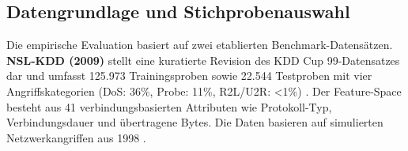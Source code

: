 \documentclass[11pt,a4paper]{article}
\begin{document}
    \subsection{Datengrundlage und Stichprobenauswahl}

    Die empirische Evaluation basiert auf zwei etablierten Benchmark-Datensätzen. \textbf{NSL-KDD (2009)} stellt eine kuratierte Revision des KDD Cup 99-Datensatzes dar und umfasst 125.973 Trainingsproben sowie 22.544 Testproben mit vier Angriffskategorien (DoS: 36\%, Probe: 11\%, R2L/U2R: <1\%) \parencite{Tavallaee2009}. Der Feature-Space besteht aus 41 verbindungsbasierten Attributen wie Protokoll-Typ, Verbindungsdauer und übertragene Bytes. Die Daten basieren auf simulierten Netzwerkangriffen aus 1998 \parencite{McHugh2000}.
\end{document}
